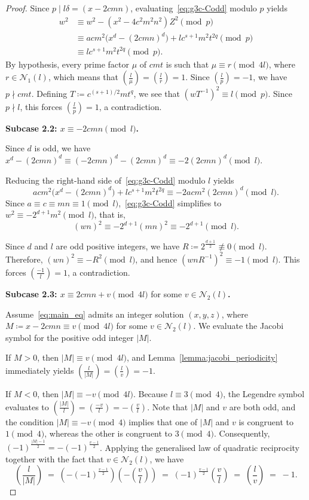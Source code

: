 \documentclass[11pt,a4paper]{amsart}
\theoremstyle{plain}
\theoremstyle{definition}
\begin{document}
\begin{proof}
Since $p \mid l\delta =(x - 2cmn) $, evaluating~\eqref{eq:g3c-Codd} modulo $p$ yields
\[
\begin{aligned}
w^2 &\equiv w^2 - (x^2 - 4c^2m^2n^2)Z^2 \pmod{p} \\
&\equiv  acm^{2}\bigl(x^{d}-(2cmn)^{d}\bigr) + lc^{s+1}m^{2}t^{2q} \pmod{p} \\
&\equiv l c^{s+1} m^{2} t^{2q} \pmod{p} .
\end{aligned}
\]
By hypothesis, every prime factor $\mu$ of $cmt$ is such that $\mu \equiv r\pmod{4l}$, where $r\in \mathcal{N}_1(l)$, which means that $\left(\frac{l}{\mu}\right) =\left(\frac{l}{r}\right) = 1$. Since $\left(\frac{l}{p}\right) = -1$, we have $p \nmid cmt$. Defining $T \coloneqq c^{(s+1)/2} m t^q$, we see that $(wT^{-1})^{2} \equiv l \pmod{p}$. Since $p \nmid l$, this forces $\left(\frac{l}{p}\right) = 1$, a contradiction.

\medskip
\noindent\textbf{Subcase 2.2: $x \equiv -2cmn \pmod l$.}\quad

Since $d$ is odd, we have $x^d -(2cmn)^{d}\equiv (-2cmn)^d-(2cmn)^{d} \equiv -2(2cmn)^d \pmod l$. 

Reducing the right-hand side of~\eqref{eq:g3c-Codd} modulo $l$ yields
\[acm^{2}\bigl(x^{d}-(2cmn)^{d}\bigr) + lc^{s+1}m^{2}t^{2q}  \equiv -2acm^{2}(2cmn)^d \pmod l.\]
Since $a \equiv c \equiv mn \equiv 1 \pmod l$,~\eqref{eq:g3c-Codd} simplifies to $w^2 \equiv -2^{d+1} m^{2}\pmod l$, that is,
\[(wn)^2 \equiv -2^{d+1} (mn)^{2}\equiv -2^{d+1}\pmod l.\]

Since $d$ and $l$ are odd positive integers, we have $R \coloneqq 2^{\frac{d+1}{2}} \not\equiv 0 \pmod l$. Therefore, $(wn)^2 \equiv -R^2 \pmod l$, and hence $(wnR^{-1})^2 \equiv -1 \pmod l$. This forces $\left(\frac{-1}{l}\right) = 1$, a contradiction. 


\medskip
\noindent\textbf{Subcase 2.3: $x \equiv 2cmn + v \pmod{4l}$} for some \textbf{$v \in \mathcal{N}_2(l)$.}\quad

Assume~\eqref{eq:main_eq} admits an integer solution $(x,y,z) $, where $M \coloneqq x - 2cmn \equiv v \pmod{4l}$ for some $v \in \mathcal{N}_2(l)$. We evaluate the Jacobi symbol for the positive odd integer $|M|$.

If $M > 0$, then $|M| \equiv v \pmod{4l}$, and Lemma~\ref{lemma:jacobi_periodicity} immediately yields $\left(\frac{l}{|M|}\right) = \left(\frac{l}{v}\right) = -1$.

If $M < 0$, then $|M| \equiv -v \pmod{4l}$. Because $l \equiv 3 \pmod 4$, the Legendre symbol evaluates to $\left(\frac{|M|}{l}\right) = \left(\frac{-v}{l}\right) = -\left(\frac{v}{l}\right)$. Note that $|M|$ and $v$ are both odd, and the condition $|M| \equiv -v \pmod 4$ implies that one of $|M|$ and $v$ is congruent to $1\pmod{4}$, whereas the other is congruent to $3\pmod{4}$. Consequently, $(-1)^{\frac{|M|-1}{2}} = -(-1)^{\frac{v-1}{2}}$. Applying the generalised law of quadratic reciprocity together with the fact that $v \in \mathcal{N}_2(l)$, we have
\[
  \left(\frac{l}{|M|}\right) \;=\; \left(-(-1)^{\frac{v-1}{2}}\right) \left(-\left(\frac{v}{l}\right)\right) \;=\; (-1)^{\frac{v-1}{2}}\left(\frac{v}{l}\right) \;=\; \left(\frac{l}{v}\right) \;=\; -1.
\]


\end{proof}
\end{document}
